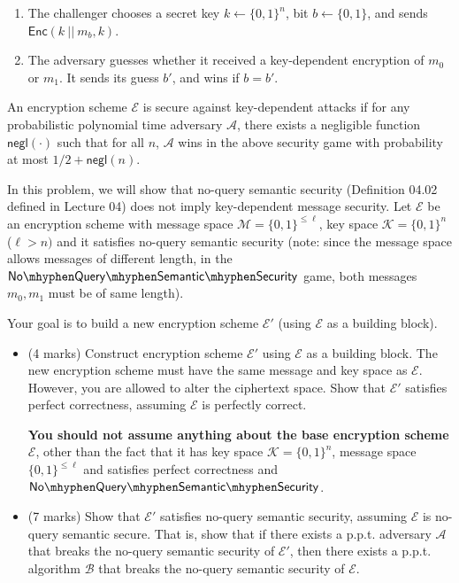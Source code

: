 \documentclass[10pt,addpoints]{exam}
\newcommand{\calA}{\mathcal{A}}
\newcommand{\calB}{\mathcal{B}}
\newcommand{\calE}{\mathcal{E}}
\newcommand{\calK}{\mathcal{K}}
\newcommand{\calM}{\mathcal{M}}
\newcommand{\enc}{\mathsf{Enc}}
\newcommand{\negl}{\mathsf{negl}}
\newcommand{\noqss}{\mathsf{No\mhyphen Query \mhyphen Semantic \mhyphen Security}}
\begin{document}
\begin{questions}
{\begin{enumerate}
    \item The challenger chooses a secret key $k \gets \{0,1\}^n$, bit $b\gets \{0,1\}$, and sends $\enc(k~||~m_b, k)$. 
    
    \item The adversary guesses whether it received a key-dependent encryption of $m_0$ or $m_1$. It sends its guess $b'$, and wins if $b=b'$.
\end{enumerate}
}
An encryption scheme $\calE$ is secure against key-dependent attacks if for any probabilistic polynomial time adversary $\calA$, there exists a negligible function $\negl(\cdot)$ such that for all $n$, $\calA$ wins in the above security game with probability at most $1/2 + \negl(n)$. 

\vspace{10pt}

In this problem, we will show that no-query semantic security  (Definition 04.02 defined in Lecture 04) does not imply key-dependent message security. Let $\calE$ be an encryption scheme with message space $\calM = \{0,1\}^{\leq \ell}$, key space $\calK = \{0,1\}^n$ ($\ell > n)$ and it satisfies no-query semantic security (note: since the message space allows messages of different length, in the $\noqss$ game, both messages $m_0, m_1$ must be of same length). 


Your goal is to build a new encryption scheme $\calE'$ (using $\calE$ as a building block). 

\begin{itemize}
    \item (4 marks) Construct encryption scheme $\calE'$ using $\calE$ as a building block. The new encryption scheme must have the same message and key space as $\calE$. However, you are allowed to alter the ciphertext space.  Show that $\calE' $ satisfies perfect correctness, assuming $\calE$ is perfectly correct. 
    
    \textbf{You should not assume anything about the base encryption scheme} $\calE$, other than the fact that it has key space $\calK = \{0,1\}^n$, message space $\{0,1\}^{\leq \ell}$ and  satisfies perfect correctness and $\noqss$.\\  

    \item (7 marks) Show that $\calE'$ satisfies no-query semantic security, assuming $\calE$ is no-query semantic secure. That is, show that if there exists a p.p.t. adversary $\calA$ that breaks the no-query semantic security of $\calE'$, then there exists a p.p.t. algorithm $\calB$ that breaks the no-query semantic security of $\calE$. \\
    

\end{itemize}
\end{questions}
\end{document}
